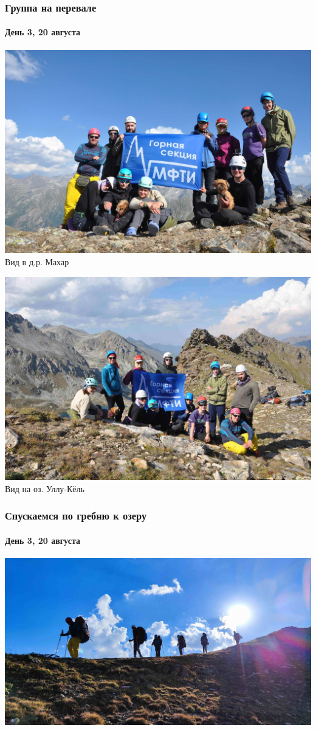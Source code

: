 \begin{frame}
	\frametitle{Группа на перевале}
	\framesubtitle{День 3, 20 августа}
	{\scriptsize
			\begin{minipage}{\fourpicsize}
			\centering
			\includegraphics[width=\textwidth]{../pics/DSC_0982}			
			Вид в д.р. Махар
		\end{minipage}
		\hfill
		\begin{minipage}{\fourpicsize}
			\centering
			\includegraphics[width=\textwidth]{../pics/DSC_0986}			
			Вид на оз. Уллу-Кёль
		\end{minipage}
		\vfill
	}
\end{frame}

\begin{frame}
	\frametitle{Спускаемся по гребню к озеру}
	\framesubtitle{День 3, 20 августа}
	\centering
	\includegraphics[width=\linewidth]{../pics/IMG_20240820_164917.jpg}			
\end{frame}

